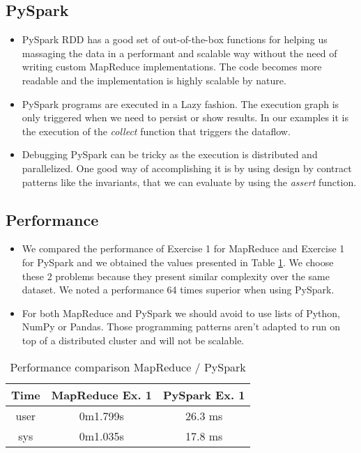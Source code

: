\documentclass[conference,compsoc]{IEEEtran}
\begin{document}
\subsection{PySpark}
\begin{itemize}
\item PySpark RDD has a good set of out-of-the-box functions for helping us massaging the data in a performant and scalable way without the need of writing custom MapReduce implementations. The code becomes more readable and the implementation is highly scalable by nature.
\item PySpark programs are executed in a Lazy fashion. The execution graph is only triggered when we need to persist or show results. In our examples it is the execution of the \textit{collect} function that triggers the dataflow.
\item Debugging PySpark can be tricky as the execution is distributed and parallelized. One good way of accomplishing it is by using design by contract patterns like the invariants, that we can evaluate by using the \textit{assert} function.
\end{itemize}

\subsection{Performance}
\begin{itemize}
\item We compared the performance of Exercise 1 for MapReduce and Exercise 1 for PySpark and we obtained the values presented in Table \ref{perf_conclusion}. We choose these 2 problems because they present similar complexity over the same dataset. We noted a performance 64 times superior when using PySpark. \par
\item For both MapReduce and PySpark we should avoid to use lists of Python, NumPy or Pandas. Those programming patterns aren't adapted to run on top of a distributed cluster and will not be scalable.
\end{itemize}

\begin{table}[!t]
\renewcommand{\arraystretch}{1.3}
\caption{Performance comparison MapReduce / PySpark}
\label{perf_conclusion}
\centering
\begin{tabular}{c||c|c}
\hline
\bfseries Time & \bfseries MapReduce Ex. 1 & \bfseries PySpark Ex. 1 \\
\hline\hline
 user & 0m1.799s           & 26.3 ms \\
 sys  & 0m1.035s           & 17.8 ms \\
\hline
\end{tabular}
\end{table}
\end{document}
